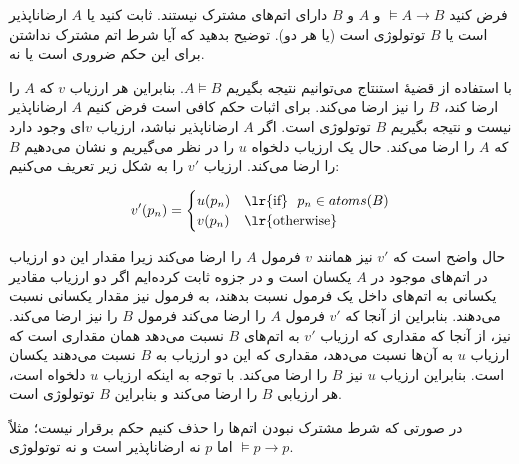 فرض کنید $\models A\rightarrow B$ و $A$ و $B$ دارای اتم‌های مشترک نیستند. ثابت کنید یا $A$ ارضاناپذیر است یا $B$ توتولوژی است (یا هر دو). توضیح بدهید که آیا شرط اتم مشترک نداشتن برای این حکم ضروری است یا نه.
\begin{ans}
  با استفاده از قضیهٔ استنتاج می‌توانیم نتیجه بگیریم $A\models B$. بنابراین هر ارزیاب $v$ که $A$ را ارضا کند، $B$ را نیز ارضا می‌کند. برای اثبات حکم کافی است فرض کنیم $A$ ارضاناپذیر نیست و نتیجه بگیریم $B$ توتولوژی است. اگر $A$ ارضاناپذیر نباشد، ارزیاب $v$ای وجود دارد که $A$ را ارضا می‌کند. حال یک ارزیاب دلخواه $u$ را در نظر می‌گیریم و نشان می‌دهیم $B$ را ارضا می‌کند. ارزیاب $v'$ را به شکل زیر تعریف می‌کنیم:

  $$
  v'(p_n)=
  \begin{cases}
  u(p_n) & \text{\lr{if}}~~p_n\in atoms(B) \\
  v(p_n) & \text{\lr{otherwise}}
  \end{cases}
  $$

  حال واضح است که $v'$ نیز همانند $v$ فرمول $A$ را ارضا می‌کند زیرا مقدار این دو ارزیاب در اتم‌های موجود در $A$ یکسان است و در جزوه ثابت کرده‌ایم اگر دو ارزیاب مقادیر یکسانی به اتم‌های داخل یک فرمول نسبت بدهند، به فرمول نیز مقدار یکسانی نسبت می‌دهند. بنابراین از آنجا که $v'$ فرمول $A$ را ارضا می‌کند فرمول $B$ را نیز ارضا می‌کند. نیز، از آنجا که مقداری که ارزیاب $v'$ به اتم‌های $B$ نسبت می‌دهد همان مقداری است که ارزیاب $u$ به آن‌ها نسبت می‌دهد، مقداری که این دو ارزیاب به $B$ نسبت می‌دهند یکسان است. بنابراین ارزیاب $u$ نیز $B$ را ارضا می‌کند. با توجه به اینکه ارزیاب $u$ دلخواه است، هر ارزیابی $B$ را ارضا می‌کند و بنابراین $B$ توتولوژی است.

  در صورتی که شرط مشترک نبودن اتم‌ها را حذف کنیم حکم برقرار نیست؛ مثلاً
  $\models p\rightarrow p$
  اما $p$ نه ارضاناپذیر است و نه توتولوژی.
\end{ans}
